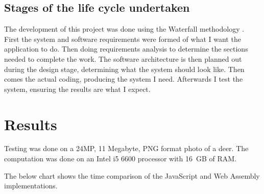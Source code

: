 \documentclass[12pt,a4paper]{article}
\begin{document}
\subsection{Stages of the life cycle undertaken}

The development of this project was done using the Waterfall methodology \cite{royce1987managing}. First the system and software requirements were formed of what I want the application to do. Then doing requirements analysis to determine the sections needed to complete the work. The software architecture is then planned out during the design stage, determining what the system should look like. Then comes the actual coding, producing the system I need. Afterwards I test the system, ensuring the results are what I expect.


\section{Results}

Testing was done on a 24MP, 11 Megabyte, PNG format photo of a deer. The computation was done on an Intel i5 6600 processor with 16 GB of RAM.


The below chart shows the time comparison of the JavaScript and Web Assembly implementations.
\end{document}
